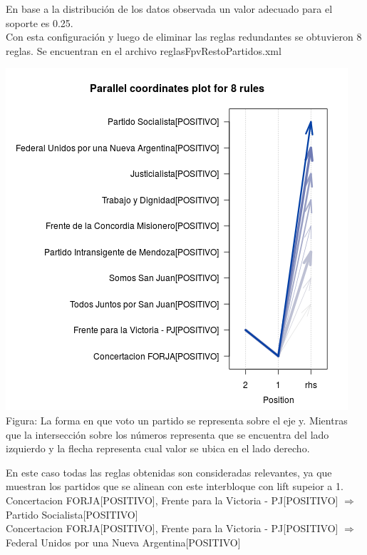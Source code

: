 \documentclass{endm}
\begin{document}
En base a la distribución de los datos observada un valor adecuado para el soporte es 0.25. \\

Con esta configuración y luego de eliminar las reglas redundantes se obtuvieron 8 reglas. Se encuentran en el archivo reglasFpvRestoPartidos.xml  \\

\begin{center}
\includegraphics[scale=0.4]{graficos/paracoordFpvRestoPartidos.png} \\
\scriptsize{Figura: La forma en que voto un partido se representa sobre el eje y. Mientras que la intersección sobre  los números representa que se encuentra del lado izquierdo y la flecha representa cual valor se ubica en el lado derecho.} \\
\end{center} 

En este caso todas las reglas obtenidas son consideradas relevantes, ya que muestran los partidos que se alinean con este interbloque con lift supeior a 1. \\

{Concertacion FORJA[POSITIVO], Frente para la Victoria - PJ[POSITIVO]}  $\Longrightarrow$ {Partido Socialista[POSITIVO]} 
\\            

{Concertacion FORJA[POSITIVO], Frente para la Victoria - PJ[POSITIVO]}  $\Longrightarrow$ {Federal Unidos por una Nueva Argentina[POSITIVO]} \\
\end{document}
